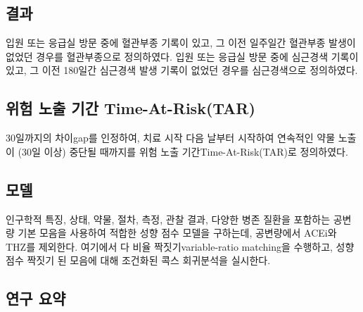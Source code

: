 \documentclass[10.5pt]{book}
\theoremstyle{definition}
\theoremstyle{definition}
\theoremstyle{definition}
\theoremstyle{remark}
\begin{document}
\subsection{결과}\label{-2}

입원 또는 응급실 방문 중에 혈관부종 기록이 있고, 그 이전 일주일간
혈관부종 발생이 없었던 경우를 혈관부종으로 정의하였다. 입원 또는 응급실
방문 중에 심근경색 기록이 있고, 그 이전 180일간 심근경색 발생 기록이
없었던 경우를 심근경색으로 정의하였다.

\subsection{위험 노출 기간 Time-At-Risk(TAR)}\label{---time-at-risktar}

30일까지의 차이gap를 인정하여, 치료 시작 다음 날부터 시작하여 연속적인
약물 노출이 (30일 이상) 중단될 때까지를 위험 노출
기간Time-At-Risk(TAR)로 정의하였다.

\subsection{모델}

인구학적 특징, 상태, 약물, 절차, 측정, 관찰 결과, 다양한 병존 질환을
포함하는 공변량 기본 모음을 사용하여 적합한 성향 점수 모델을 구하는데,
공변량에서 ACEi와 THZ를 제외한다. 여기에서 다 비율 짝짓기variable-ratio
matching을 수행하고, 성향 점수 짝짓기 된 모음에 대해 조건화된 콕스
회귀분석을 실시한다.

\subsection{연구 요약}\label{-}
\end{document}

